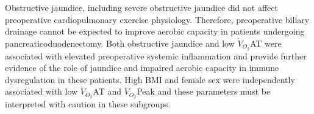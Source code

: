 Obstructive jaundice, including severe obstructive jaundice did not affect preoperative cardiopulmonary exercise physiology. 
Therefore, preoperative biliary drainage cannot be expected to improve aerobic capacity in patients undergoing pancreaticoduodenectomy.
Both obstructive jaundice and low $\dot{V}_{O_2}$AT were associated with elevated preoperative systemic inflammation and provide further evidence of the role of jaundice and impaired aerobic capacity in immune dysregulation in these patients.
High BMI and female sex were independently associated with low $\dot{V}_{O_2}$AT and $\dot{V}_{O_2}$Peak and these parameters must be interpreted with caution in these subgroups.
